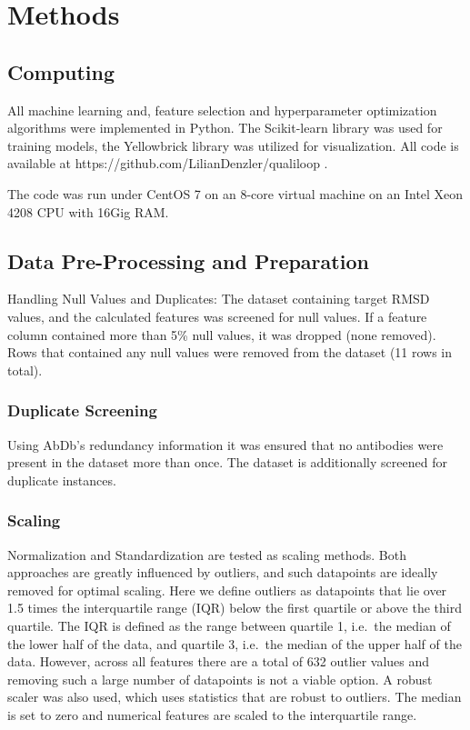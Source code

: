 \documentclass[12pt]{article}
\begin{document}
\section{Methods}

\subsection{Computing}
All machine learning and, feature selection and hyperparameter
optimization algorithms were implemented in Python. The Scikit-learn
library was used for training models, the
Yellowbrick\cite{Bengfort2021} library was utilized for
visualization. All code is available at
https://github.com/LilianDenzler/qualiloop .

The code was run under CentOS 7 on an 8-core virtual machine on an
Intel Xeon 4208 CPU with 16Gig RAM.

\subsection{Data Pre-Processing and Preparation}
Handling Null Values and Duplicates: The dataset containing target
RMSD values, and the calculated features was screened for null
values. If a feature column contained more than 5\% null values, it
was dropped (none removed). Rows that contained any null values were
removed from the dataset (11 rows in total).

\subsubsection{Duplicate Screening}
Using AbDb's redundancy information it was ensured that no antibodies
were present in the dataset more than once. The dataset is
additionally screened for duplicate instances.

\subsubsection{Scaling}
Normalization and Standardization are tested as scaling methods. Both
approaches are greatly influenced by outliers, and such datapoints are
ideally removed for optimal scaling. Here we define outliers as
datapoints that lie over 1.5 times the interquartile range (IQR) below
the first quartile or above the third quartile. The IQR is defined as
the range between quartile 1, i.e.\ the median of the lower half of the
data, and quartile 3, i.e.\ the median of the upper half of the
data. However, across all features there are a total of 632 outlier
values and removing such a large number of datapoints is not a viable
option. A robust scaler was also used, which uses statistics that are
robust to outliers. The median is set to zero and numerical features
are scaled to the interquartile range.
\end{document}
